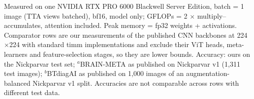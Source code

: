 Measured on one NVIDIA RTX PRO 6000 Blackwell Server Edition, batch = 1 image (TTA views batched), bf16, model only; GFLOPs = 2 $\times$ multiply--accumulates, attention included. Peak memory = fp32 weights + activations. Comparator rows are our measurements of the published CNN backbones at 224$\times$224 with standard timm implementations and exclude their ViT heads, meta-learners and feature-selection stages, so they are lower bounds. Accuracy: ours on the Nickparvar test set; $^{a}$BRAIN-META as published on Nickparvar v1 (1,311 test images); $^{b}$BTdiagAI as published on 1,000 images of an augmentation-balanced Nickparvar v1 split. Accuracies are not comparable across rows with different test data.
